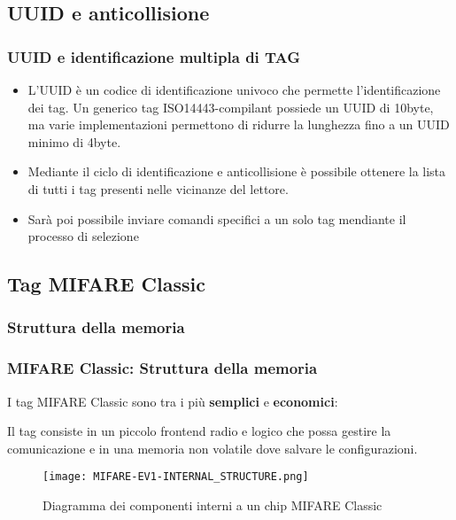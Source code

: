 \subsection{UUID e anticollisione}
\begin{frame}
    \frametitle{UUID e identificazione multipla di TAG}
    \begin{itemize}
        \item<1-> L'UUID è un codice di identificazione univoco che permette l'identificazione dei tag.
        Un generico tag ISO14443-compilant possiede un UUID di 10byte, ma varie implementazioni permettono di ridurre
        la lunghezza fino a un UUID minimo di 4byte.\cite{nxpmifareuidhandling}
        \item<2-> Mediante il ciclo di identificazione e anticollisione è possibile ottenere la lista di tutti i tag presenti nelle vicinanze del lettore.
        \item<3-> Sarà poi possibile inviare comandi specifici a un solo tag mendiante il processo di selezione
    \end{itemize}
\end{frame}
\note{}

\subsection{Tag MIFARE Classic}
\subsubsection{Struttura della memoria}
\begin{frame}
    \frametitle{MIFARE Classic: Struttura della memoria}
    I tag MIFARE Classic sono tra i più \textbf{semplici} e \textbf{economici}:
    
    Il tag consiste in un piccolo frontend radio e logico che possa gestire la comunicazione
    e in una memoria non volatile dove salvare le configurazioni.\cite{nxpmifareev1datasheet}

    \begin{figure}
        \centering
        \texttt{[image: MIFARE-EV1-INTERNAL\_STRUCTURE.png]}\cite{nxpmifareev1datasheet}
        \caption{Diagramma dei componenti interni a un chip MIFARE Classic}
        \label{fig:internal-mifare-block-diagram}
    \end{figure}
\end{frame}

